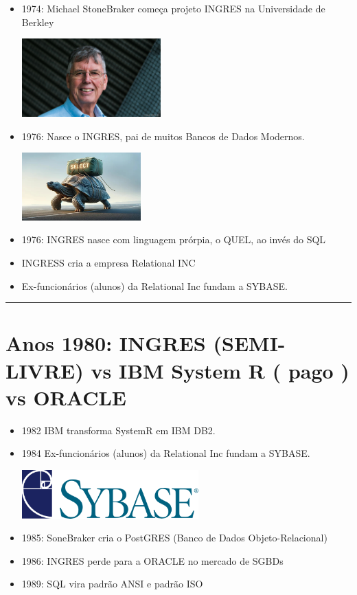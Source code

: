 \documentclass[
]{book}
\begin{document}
\begin{itemize}
\item
  1974: Michael StoneBraker começa projeto INGRES na Universidade de Berkley

  \includegraphics[width=2.10417in,height=\textheight]{images/2025-08-11/07-Michael_StoneBraker.png}
\item
  1976: Nasce o INGRES, pai de muitos Bancos de Dados Modernos.

  \includegraphics[width=1.80208in,height=\textheight]{images/2025-08-11/03-ingress-1.0.jpg}
\item
  1976: INGRES nasce com linguagem prórpia, o QUEL, ao invés do SQL
\item
  INGRESS cria a empresa Relational INC
\item
  Ex-funcionários (alunos) da Relational Inc fundam a SYBASE.
\end{itemize}

\begin{center}\rule{0.5\linewidth}{0.5pt}\end{center}

\section{Anos 1980: INGRES (SEMI-LIVRE) vs IBM System R ( pago ) vs ORACLE}\label{anos-1980-ingres-semi-livre-vs-ibm-system-r-pago-vs-oracle}

\begin{itemize}
\item
  1982 IBM transforma SystemR em IBM DB2.
\item
  1984 Ex-funcionários (alunos) da Relational Inc fundam a SYBASE.

  \includegraphics[width=2.67708in,height=\textheight]{images/2025-08-11/08-sybase.png}
\item
  1985: SoneBraker cria o PostGRES (Banco de Dados Objeto-Relacional)
\item
  1986: INGRES perde para a ORACLE no mercado de SGBDs
\item
  1989: SQL vira padrão ANSI e padrão ISO
\end{itemize}
\end{document}
